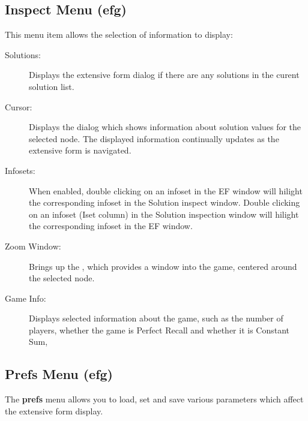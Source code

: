\documentclass[12pt]{report}
\begin{document}
\subsection{Inspect Menu (efg)}\label{efinspect}

This menu item allows the selection of information to display:

\begin{description}
\item[Solutions:] Displays the extensive form  dialog if there are any solutions in
the curent solution list.
\item[Cursor:] Displays the  dialog
which shows information about solution values for the selected
node. The displayed information continually updates as the extensive
form is navigated.
\item[Infosets:] When enabled, double clicking on an infoset in the EF
window will hilight the corresponding infoset in the Solution inspect
window.  Double clicking on an infoset (Iset column) in the Solution
inspection window will hilight the corresponding infoset in the EF
window.
\item[Zoom Window:] Brings up the ,
which provides a window into the game, centered around the selected
node.
\item[Game Info:] Displays selected information about the game, such
as the number of players, whether the game is Perfect Recall and
whether it is Constant Sum,
\end{description}

\subsection{Prefs Menu (efg)}\label{displaymenu}

The {\bf prefs} menu allows you to load, set and save various
parameters which affect the extensive form display.
\end{document}
